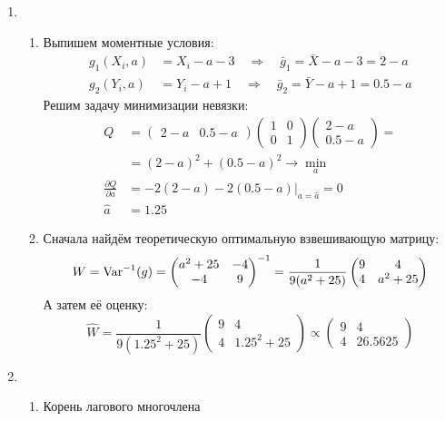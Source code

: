 \begin{enumerate}
\item
\begin{enumerate}
\item Выпишем моментные условия:
\begin{align*}
g_1(X_i, a) &= X_i - a - 3 \quad \Rightarrow \quad \bar{g}_1 = \bar X - a - 3 = 2 - a  \\
g_2(Y_i, a) &= Y_i - a + 1 \quad \Rightarrow \quad \bar{g}_2 = \bar Y - a + 1 = 0.5 - a
\end{align*}
Решим задачу минимизации невязки:
\begin{align*}
Q &= \begin{pmatrix}
2 - a &  0.5 - a
\end{pmatrix}
\begin{pmatrix}
1 & 0 \\
0 & 1
\end{pmatrix}
\begin{pmatrix}
2 - a \\
0.5 - a
\end{pmatrix} = \\
&= \left(2 - a \right)^2 + \left(0.5 - a \right)^2 \to \min_a \\
\frac{\partial Q}{\partial a} &= \left. -2(2 - a) - 2(0.5 - a) \right|_{a = \hat a} = 0 \\
\hat a &= 1.25
\end{align*}
\item Сначала найдём теоретическую оптимальную взвешивающую матрицу:
\[
W = \operatorname{Var}^{-1}(g) =
\begin{pmatrix}
a^2 + 25 & -4 \\
-4 & 9
\end{pmatrix}^{-1} =
\frac{1}{9(a^2 + 25)}
\begin{pmatrix}
9 & 4 \\
4 & a^2 + 25
\end{pmatrix}
\]
А затем её оценку:
\[
\widehat W = \frac{1}{9(1.25^2 + 25)}
\begin{pmatrix}
9 & 4 \\
4 & 1.25^2 + 25
\end{pmatrix}
\propto
\begin{pmatrix}
9 & 4 \\
4 & 26.5625
\end{pmatrix}
\]
\end{enumerate}
\item
\begin{enumerate}
\item Корень лагового многочлена

\end{enumerate}
\end{enumerate}
